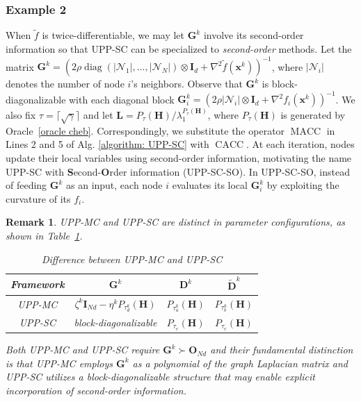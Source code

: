 \documentclass[12pt,draftcls,onecolumn]{IEEEtran}
\newcommand{\bG}{{\mathbf{G}}}
\newcommand{\bI}{{\mathbf{I}}}
\newcommand{\bH}{{\mathbf{H}}}
\newcommand{\bD}{{\mathbf{D}}}
\newtheorem{remark}{Remark}
\begin{document}
\subsubsection*{Example 2}

When $\tilde{f}$ is twice-differentiable, we may let $\mathbf{G}^k$ involve its second-order information so that UPP-SC can be specialized to \textit{second-order} methods. Let the matrix $\mathbf{G}^k = (2\rho \operatorname{diag}(|\mathcal{N}_1|,\dots,|\mathcal{N}_N|)\otimes \bI_d+\nabla^2 \tilde{f}(\mathbf{x}^k))^{-1}$, where $|\mathcal{N}_i|$ denotes the number of node $i$'s neighbors. Observe that $\mathbf{G}^k$ is block-diagonalizable with each diagonal block $\bG_i^k=(2\rho|\mathcal{N}_i|\otimes \bI_d+\nabla^2 f_i(\mathbf{x}^k))^{-1}$. We also fix $\tau=\lceil \sqrt{\gamma}\rceil$ and let $\mathbf{L}=P_{\tau}(\mathbf{H})/\lambda_1^{P_{\tau}(\mathbf{H})}$, where $P_{\tau}(\mathbf{H})$ is generated by Oracle~\ref{oracle cheb}. Correspondingly, we substitute the operator $\operatorname{MACC}$ in Lines 2 and 5 of Alg. \ref{algorithm: UPP-SC} with $\operatorname{CACC}$. At each iteration, nodes update their local variables using second-order information, motivating the name UPP-SC with \textbf{S}econd-\textbf{O}rder information (UPP-SC-SO). In UPP-SC-SO, instead of feeding $\bG^k$ as an input, each node $i$ evaluates its local $\bG_i^k$ by exploiting the curvature of its $f_i$.

\begin{remark}
UPP-MC and UPP-SC are distinct in parameter configurations, as shown in Table~\ref{tab:realizations}.
\begin{table}[h]
    \centering
    \begin{tabular}{c|c|c|c}
        \toprule
         Framework & $\bG^k$ & $\bD^k$ & $\tilde{\bD}^k$ \\
         \midrule
         UPP-MC & $\zeta^k \mathbf{I}_{Nd} - \eta^k P_{\tau_d^k}(\mathbf{H})$ & $P_{\tau_a^k}(\mathbf{H})$ & $P_{\tau_b^k}(\mathbf{H})$\\
         \midrule
         UPP-SC & block-diagonalizable & $P_{\tau_e}(\bH)$ & $P_{\tau_e}(\bH)$\\
         \bottomrule
    \end{tabular}
    \caption{Difference between UPP-MC and UPP-SC}
    \label{tab:realizations}
\end{table}

Both UPP-MC and UPP-SC require $\bG^k\succ \mathbf{O}_{Nd}$ and their fundamental distinction is that UPP-MC employs $\bG^k$ as a polynomial of the graph Laplacian matrix and UPP-SC utilizes a block-diagonalizable structure that may enable explicit incorporation of second-order information.
\end{remark}
\end{document}
